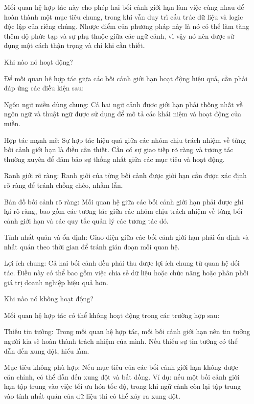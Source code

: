 Mối quan hệ hợp tác này cho phép hai bối cảnh giới hạn làm việc cùng nhau để hoàn thành một mục tiêu chung, trong khi vẫn duy trì cấu trúc dữ liệu và logic độc lập của riêng chúng. Nhược điểm của phương pháp này là nó có thể làm tăng thêm độ phức tạp và sự phụ thuộc giữa các ngữ cảnh, vì vậy nó nên được sử dụng một cách thận trọng và chỉ khi cần thiết.

Khi nào nó hoạt động?

Để mối quan hệ hợp tác giữa các bối cảnh giới hạn hoạt động hiệu quả, cần phải đáp ứng các điều kiện sau:

Ngôn ngữ miền dùng chung: Cả hai ngữ cảnh được giới hạn phải thống nhất về ngôn ngữ và thuật ngữ được sử dụng để mô tả các khái niệm và hoạt động của miền.

Hợp tác mạnh mẽ: Sự hợp tác hiệu quả giữa các nhóm chịu trách nhiệm về từng bối cảnh giới hạn là điều cần thiết. Cần có sự giao tiếp rõ ràng và tương tác thường xuyên để đảm bảo sự thống nhất giữa các mục tiêu và hoạt động.

Ranh giới rõ ràng: Ranh giới của từng bối cảnh được giới hạn cần được xác định rõ ràng để tránh chồng chéo, nhầm lẫn.

Bản đồ bối cảnh rõ ràng: Mối quan hệ giữa các bối cảnh giới hạn phải được ghi lại rõ ràng, bao gồm các tương tác giữa các nhóm chịu trách nhiệm về từng bối cảnh giới hạn và các quy tắc quản lý các tương tác đó.

Tính nhất quán và ổn định: Giao diện giữa các bối cảnh giới hạn phải ổn định và nhất quán theo thời gian để tránh gián đoạn mối quan hệ.

Lợi ích chung: Cả hai bối cảnh đều phải thu được lợi ích chung từ quan hệ đối tác. Điều này có thể bao gồm việc chia sẻ dữ liệu hoặc chức năng hoặc phân phối giá trị doanh nghiệp hiệu quả hơn.

Khi nào nó không hoạt động?

Mối quan hệ hợp tác có thể không hoạt động trong các trường hợp sau:

Thiếu tin tưởng: Trong mối quan hệ hợp tác, mỗi bối cảnh giới hạn nên tin tưởng người kia sẽ hoàn thành trách nhiệm của mình. Nếu thiếu sự tin tưởng có thể dẫn đến xung đột, hiểu lầm.

Mục tiêu không phù hợp: Nếu mục tiêu của các bối cảnh giới hạn không được căn chỉnh, có thể dẫn đến xung đột và bất đồng. Ví dụ: nếu một bối cảnh giới hạn tập trung vào việc tối ưu hóa tốc độ, trong khi ngữ cảnh còn lại tập trung vào tính nhất quán của dữ liệu thì có thể xảy ra xung đột.

